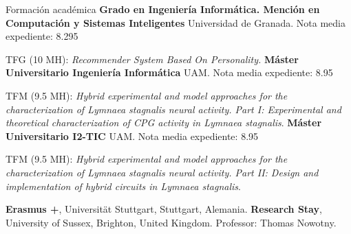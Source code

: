 \begin{rubric}{Formación académica}
	\entry*[2014 -- 2018]%
	\textbf{Grado en Ingeniería Informática. Mención en Computación y Sistemas Inteligentes} Universidad de Granada. Nota media expediente: 8.295
	 \par TFG (10 MH): \emph{Recommender System Based On Personality.} 
	\entry*[2018 -- 2019]%
	\textbf{Máster Universitario Ingeniería Informática} UAM. Nota media expediente: 8.95\par
	 TFM (9.5 MH): \emph{Hybrid experimental and model approaches for the characterization of \textit{Lymnaea stagnalis} neural activity. Part I: Experimental and theoretical characterization of CPG activity in \textit{Lymnaea stagnalis}}.
	\vspace{-3pt}
	\entry*[2018 -- 2019]%
	\textbf{Máster Universitario I2-TIC} UAM. Nota media expediente: 8.95\par
	 TFM (9.5 MH): \emph{Hybrid experimental and model approaches for the characterization of \textit{Lymnaea stagnalis} neural activity. Part II: Design and implementation of hybrid circuits in \textit{Lymnaea stagnalis}}.
	
	\entry*[Curso 2016-2017] \textbf{Erasmus +}, Universität Stuttgart, Stuttgart, Alemania.
	 \textbf{Research Stay}, University of Sussex, Brighton, United Kingdom. Professor: Thomas Nowotny.
	
\end{rubric}